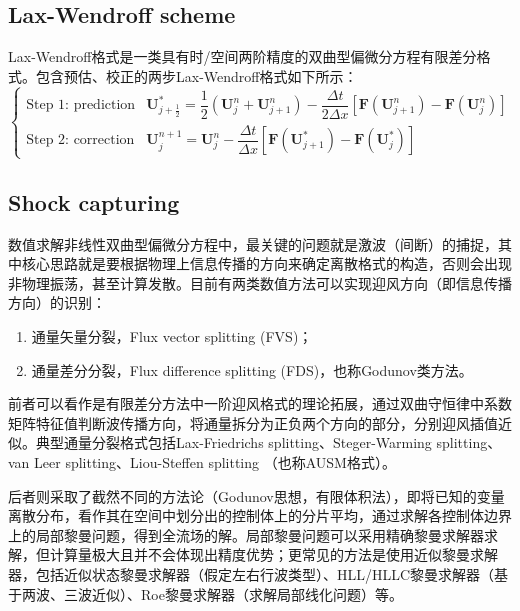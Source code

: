 \documentclass[11pt]{article}
\begin{document}
\subsection{Lax-Wendroff scheme}
Lax-Wendroff格式是一类具有时/空间两阶精度的双曲型偏微分方程有限差分格式。包含预估、校正的两步Lax-Wendroff格式如下所示：
\begin{equation}
	\left\{\begin{array}{ll}
		\text{Step 1: prediction} & \bm{U}_{j+\frac{1}{2}}^*=\dfrac{1}{2}\left(\bm{U}_j^n+\bm{U}_{j+1}^n\right)-\dfrac{\Delta t}{2\Delta x}\left[\bm{F}(\bm{U}_{j+1}^n)-\bm{F}(\bm{U}_{j}^n)\right] \\[6pt]
		\text{Step 2: correction} & \bm{U}_j^{n+1}=\bm{U}_j^n-\dfrac{\Delta t}{\Delta x}\left[\bm{F}(\bm{U}_{j+1}^*)-\bm{F}(\bm{U}_{j}^*)\right]
	\end{array}\right.
\end{equation}

\subsection{Shock capturing}
数值求解非线性双曲型偏微分方程中，最关键的问题就是激波（间断）的捕捉，其中核心思路就是要根据物理上信息传播的方向来确定离散格式的构造，否则会出现非物理振荡，甚至计算发散。目前有两类数值方法可以实现迎风方向（即信息传播方向）的识别：
\begin{enumerate}[label=(\arabic*)]
	\item 通量矢量分裂，Flux vector splitting (FVS)；
	\item 通量差分分裂，Flux difference splitting (FDS)，也称Godunov类方法。
\end{enumerate}

前者可以看作是有限差分方法中一阶迎风格式的理论拓展，通过双曲守恒律中系数矩阵特征值判断波传播方向，将通量拆分为正负两个方向的部分，分别迎风插值近似。典型通量分裂格式包括Lax-Friedrichs splitting、Steger-Warming splitting、van Leer splitting、Liou-Steffen splitting （也称AUSM格式）。

后者则采取了截然不同的方法论（Godunov思想，有限体积法），即将已知的变量离散分布，看作其在空间中划分出的控制体上的分片平均，通过求解各控制体边界上的局部黎曼问题，得到全流场的解。局部黎曼问题可以采用精确黎曼求解器求解，但计算量极大且并不会体现出精度优势；更常见的方法是使用近似黎曼求解器，包括近似状态黎曼求解器（假定左右行波类型）、HLL/HLLC黎曼求解器（基于两波、三波近似）、Roe黎曼求解器（求解局部线化问题）等。
\end{document}
